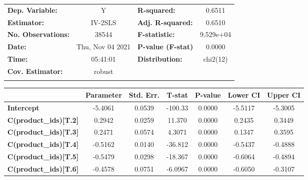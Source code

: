 \begin{center}
\begin{tabular}{lclc}
\toprule
\textbf{Dep. Variable:}        &         Y          & \textbf{  R-squared:         } &      0.6511      \\
\textbf{Estimator:}            &      IV-2SLS       & \textbf{  Adj. R-squared:    } &      0.6510      \\
\textbf{No. Observations:}     &       38544        & \textbf{  F-statistic:       } &    9.529e+04     \\
\textbf{Date:}                 &  Thu, Nov 04 2021  & \textbf{  P-value (F-stat)   } &      0.0000      \\
\textbf{Time:}                 &      05:41:01      & \textbf{  Distribution:      } &     chi2(12)     \\
\textbf{Cov. Estimator:}       &       robust       & \textbf{                     } &                  \\
\textbf{}                      &                    & \textbf{                     } &                  \\
\bottomrule
\end{tabular}
\begin{tabular}{lcccccc}
                               & \textbf{Parameter} & \textbf{Std. Err.} & \textbf{T-stat} & \textbf{P-value} & \textbf{Lower CI} & \textbf{Upper CI}  \\
\midrule
\textbf{Intercept}             &      -5.4061       &       0.0539       &     -100.33     &      0.0000      &      -5.5117      &      -5.3005       \\
\textbf{C(product\_ids)[T.2]}  &       0.2942       &       0.0259       &      11.370     &      0.0000      &       0.2435      &       0.3449       \\
\textbf{C(product\_ids)[T.3]}  &       0.2471       &       0.0574       &      4.3071     &      0.0000      &       0.1347      &       0.3595       \\
\textbf{C(product\_ids)[T.4]}  &      -0.5162       &       0.0140       &     -36.812     &      0.0000      &      -0.5437      &      -0.4888       \\
\textbf{C(product\_ids)[T.5]}  &      -0.5479       &       0.0298       &     -18.367     &      0.0000      &      -0.6064      &      -0.4894       \\
\textbf{C(product\_ids)[T.6]}  &      -0.4578       &       0.0751       &     -6.0967     &      0.0000      &      -0.6050      &      -0.3107       \\

\end{tabular}
\end{center}

